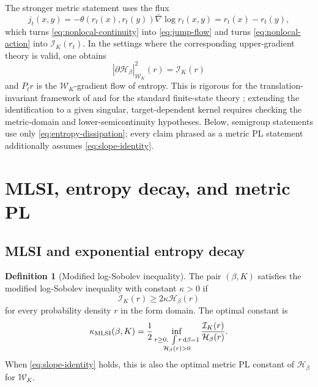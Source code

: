 \documentclass[11pt]{article}
\theoremstyle{definition}
\newtheorem{definition}[theorem]{Definition}
\newcommand{\dd}{\,\mathrm d}
\newcommand{\cI}{\mathcal I}
\newcommand{\cH}{\mathcal H}
\newcommand{\cW}{\mathcal W}
\newcommand{\bgrad}{\bar\nabla}
\newcommand{\abs}[1]{\left\lvert #1\right\rvert}
\begin{document}
The stronger metric statement uses the flux
\begin{equation}\label{eq:entropy-flux}
  j_t(x,y)=-\theta(r_t(x),r_t(y))\bgrad\log r_t(x,y)
  =r_t(x)-r_t(y),
\end{equation}
which turns \eqref{eq:nonlocal-continuity} into \eqref{eq:jump-flow} and
turns \eqref{eq:nonlocal-action} into $\cI_K(r_t)$.  In the settings where
the corresponding upper-gradient theory is valid, one obtains
\begin{equation}\label{eq:slope-identity}
  \abs{\partial\cH_\beta}_{\cW_K}^2(r)=\cI_K(r)
\end{equation}
and $P_t r$ is the $\cW_K$-gradient flow of entropy.  This is rigorous for
the translation-invariant framework of \citet{Erbar2014JumpEntropy} and for
the standard finite-state theory \citep{ErbarMaas2012}; extending the identification to a given
singular, target-dependent kernel requires checking the metric-domain and
lower-semicontinuity hypotheses.  Below, semigroup statements use only
\eqref{eq:entropy-dissipation}; every claim phrased as a metric PL statement
additionally assumes \eqref{eq:slope-identity}.

\section{MLSI, entropy decay, and metric PL}

\subsection{MLSI and exponential entropy decay}

\begin{definition}[Modified log-Sobolev inequality]
\label{def:nonlocal-pl}
The pair $(\beta,K)$ satisfies the modified log-Sobolev inequality with constant
$\kappa>0$ if
\begin{equation}\label{eq:nonlocal-pl}
  \cI_K(r)
  \geq 2\kappa\cH_\beta(r)
\end{equation}
for every probability density $r$ in the form domain.  The optimal constant is
\begin{equation}\label{eq:optimal-mlsi-constant}
  \kappa_{\rm MLSI}(\beta,K)
  =\frac12\inf_{\substack{r\geq0,\ \int r\dd\beta=1\\
                          \cH_\beta(r)>0}}
    \frac{\cI_K(r)}{\cH_\beta(r)}.
\end{equation}
When \eqref{eq:slope-identity} holds, this is also the optimal metric PL
constant of $\cH_\beta$ for $\cW_K$.
\end{definition}
\end{document}
